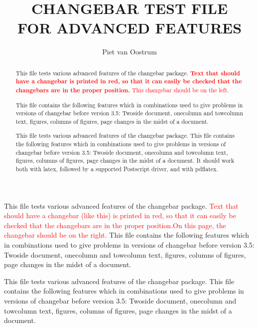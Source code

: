 \documentclass[12pt,twoside]{article}
\begin{document}
\setmainfont[Mapping=tex-text,Ligatures=Common]{Minion Pro}

\title{CHANGEBAR TEST FILE \\FOR ADVANCED FEATURES}
\author{Piet van Oostrum}
\maketitle

\raggedbottom

\begin {abstract}

This file tests various advanced features of the changebar package.
\cbstart\textcolor{red}{\textbf{Text that should have a changebar is
  printed in red, so that it can easily be checked that the changebars are
  in the proper position.} This changebar should be on the left.
\cbend}

This file contains the following features which in combinations used to
give problems in  versions of changebar before version 3.5:
Twoside document, onecolumn and towcolumn text, figures, columns of
figures, page changes in the midst of a document.

This file tests various advanced features of the changebar package.
This file contains the following features which in combinations used to
give problems in  versions of changebar before version 3.5:
Twoside document, onecolumn and towcolumn text, figures, columns of
figures, page changes in the midst of a document.
It should work both with latex, followed by a supported Postscript driver,
and with pdflatex.
\end{abstract}

\newpage

This file tests various advanced features of the changebar package.
\cbstart\textcolor{red}{Text that should have a changebar (like this) is
  printed in red, so that it can easily be checked that the changebars are
  in the proper position.On this page, the changebar should be on the right.
\cbend}
This file contains the following features which in combinations used to
give problems in  versions of changebar before version 3.5:
Twoside document, onecolumn and towcolumn text, figures, columns of
figures, page changes in the midst of a document.

This file tests various advanced features of the changebar package.
This file contains the following features which in combinations used to
give problems in  versions of changebar before version 3.5:
Twoside document, onecolumn and towcolumn text, figures, columns of
figures, page changes in the midst of a document.
\end{document}
